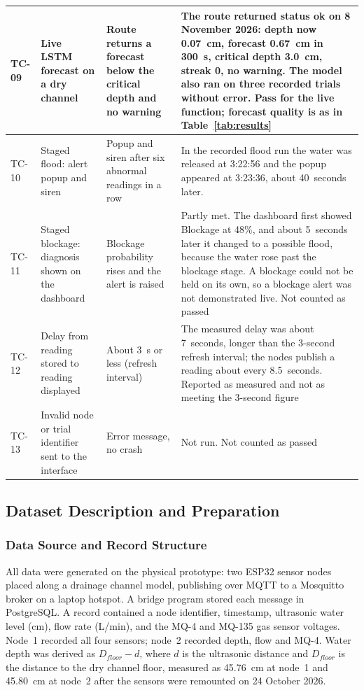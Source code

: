 \documentclass[12pt, a4paper]{article}
\begin{document}
\begin{longtable}{|p{1.2cm}|p{3.3cm}|p{3.2cm}|p{6.0cm}|}
\hline
TC-09 & Live LSTM forecast on a dry channel & Route returns a forecast below the critical depth and no warning & The route returned status ok on 8 November 2026: depth now 0.07~cm, forecast 0.67~cm in 300~s, critical depth 3.0~cm, streak 0, no warning. The model also ran on three recorded trials without error. Pass for the live function; forecast quality is as in Table~\ref{tab:results} \\
\hline
TC-10 & Staged flood: alert popup and siren & Popup and siren after six abnormal readings in a row & In the recorded flood run the water was released at 3:22:56 and the popup appeared at 3:23:36, about 40~seconds later.  \\
\hline
TC-11 & Staged blockage: diagnosis shown on the dashboard & Blockage probability rises and the alert is raised & Partly met. The dashboard first showed Blockage at 48\%, and about 5~seconds later it changed to a possible flood, because the water rose past the blockage stage. A blockage could not be held on its own, so a blockage alert was not demonstrated live. Not counted as passed \\
\hline
TC-12 & Delay from reading stored to reading displayed & About 3~s or less (refresh interval) & The measured delay was about 7~seconds, longer than the 3-second refresh interval; the nodes publish a reading about every 8.5~seconds. Reported as measured and not as meeting the 3-second figure \\
\hline
TC-13 & Invalid node or trial identifier sent to the interface & Error message, no crash & Not run. Not counted as passed \\
\hline
\end{longtable}

\subsection{Dataset Description and Preparation}
\label{sec:dataset}

\subsubsection{Data Source and Record Structure}

All data were generated on the physical prototype: two ESP32 sensor nodes placed along a drainage channel model, publishing over MQTT to a Mosquitto broker on a laptop hotspot. A bridge program stored each message in PostgreSQL. A record contained a node identifier, timestamp, ultrasonic water level (cm), flow rate (L/min), and the MQ-4 and MQ-135 gas sensor voltages. Node~1 recorded all four sensors; node~2 recorded depth, flow and MQ-4. Water depth was derived as $D_{floor} - d$, where $d$ is the ultrasonic distance and $D_{floor}$ is the distance to the dry channel floor, measured as 45.76~cm at node~1 and 45.80~cm at node~2 after the sensors were remounted on 24 October 2026.
\end{document}
